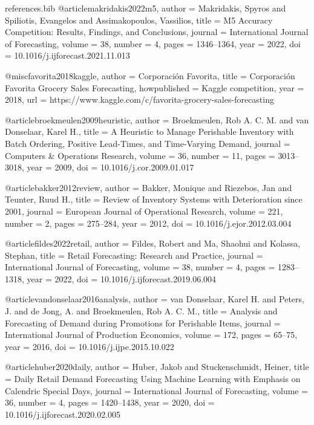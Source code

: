 \begin{filecontents*}{references.bib}
@article{makridakis2022m5,
  author  = {Makridakis, Spyros and Spiliotis, Evangelos and Assimakopoulos, Vassilios},
  title   = {{M5} Accuracy Competition: Results, Findings, and Conclusions},
  journal = {International Journal of Forecasting},
  volume  = {38},
  number  = {4},
  pages   = {1346--1364},
  year    = {2022},
  doi     = {10.1016/j.ijforecast.2021.11.013}
}

@misc{favorita2018kaggle,
  author       = {{Corporaci{\'o}n Favorita}},
  title        = {Corporaci{\'o}n Favorita Grocery Sales Forecasting},
  howpublished = {Kaggle competition},
  year         = {2018},
  url          = {https://www.kaggle.com/c/favorita-grocery-sales-forecasting}
}

@article{broekmeulen2009heuristic,
  author  = {Broekmeulen, Rob A. C. M. and van Donselaar, Karel H.},
  title   = {A Heuristic to Manage Perishable Inventory with Batch Ordering, Positive Lead-Times, and Time-Varying Demand},
  journal = {Computers \& Operations Research},
  volume  = {36},
  number  = {11},
  pages   = {3013--3018},
  year    = {2009},
  doi     = {10.1016/j.cor.2009.01.017}
}

@article{bakker2012review,
  author  = {Bakker, Monique and Riezebos, Jan and Teunter, Ruud H.},
  title   = {Review of Inventory Systems with Deterioration since 2001},
  journal = {European Journal of Operational Research},
  volume  = {221},
  number  = {2},
  pages   = {275--284},
  year    = {2012},
  doi     = {10.1016/j.ejor.2012.03.004}
}

@article{fildes2022retail,
  author  = {Fildes, Robert and Ma, Shaohui and Kolassa, Stephan},
  title   = {Retail Forecasting: Research and Practice},
  journal = {International Journal of Forecasting},
  volume  = {38},
  number  = {4},
  pages   = {1283--1318},
  year    = {2022},
  doi     = {10.1016/j.ijforecast.2019.06.004}
}

@article{vandonselaar2016analysis,
  author  = {van Donselaar, Karel H. and Peters, J. and de Jong, A. and Broekmeulen, Rob A. C. M.},
  title   = {Analysis and Forecasting of Demand during Promotions for Perishable Items},
  journal = {International Journal of Production Economics},
  volume  = {172},
  pages   = {65--75},
  year    = {2016},
  doi     = {10.1016/j.ijpe.2015.10.022}
}

@article{huber2020daily,
  author  = {Huber, Jakob and Stuckenschmidt, Heiner},
  title   = {Daily Retail Demand Forecasting Using Machine Learning with Emphasis on Calendric Special Days},
  journal = {International Journal of Forecasting},
  volume  = {36},
  number  = {4},
  pages   = {1420--1438},
  year    = {2020},
  doi     = {10.1016/j.ijforecast.2020.02.005}
}


\end{filecontents*}
